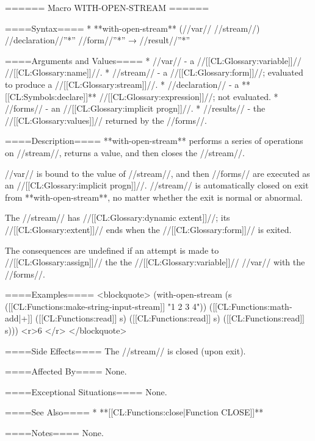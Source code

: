 ====== Macro WITH-OPEN-STREAM ======

====Syntax====
  * **with-open-stream** (//var// //stream//) //declaration//''*'' //form//''*'' → //result//''*''

====Arguments and Values====
  * //var// - a //[[CL:Glossary:variable]]// //[[CL:Glossary:name]]//.
  * //stream// - a //[[CL:Glossary:form]]//; evaluated to produce a //[[CL:Glossary:stream]]//.
  * //declaration// - a **[[CL:Symbols:declare]]** //[[CL:Glossary:expression]]//; not evaluated.
  * //forms// - an //[[CL:Glossary:implicit progn]]//.
  * //results// - the //[[CL:Glossary:values]]// returned by the //forms//.

====Description====
**with-open-stream** performs a series of operations on //stream//, returns a value, and then closes the //stream//.

//var// is bound to the value of //stream//, and then //forms// are executed as an //[[CL:Glossary:implicit progn]]//. //stream// is automatically closed on exit from **with-open-stream**, no matter whether the exit is normal or abnormal.

The //stream// has //[[CL:Glossary:dynamic extent]]//; its //[[CL:Glossary:extent]]// ends when the //[[CL:Glossary:form]]// is exited.

The consequences are undefined if an attempt is made to //[[CL:Glossary:assign]]// the the //[[CL:Glossary:variable]]// //var// with the //forms//.

====Examples====
<blockquote> 
(with-open-stream (s ([[CL:Functions:make-string-input-stream]] "1 2 3 4")) 
  ([[CL:Functions:math-add|+]] ([[CL:Functions:read]] s) 
     ([[CL:Functions:read]] s) 
     ([[CL:Functions:read]] s))) <r>6 </r>
</blockquote>

====Side Effects====
The //stream// is closed (upon exit).

====Affected By====
None.

====Exceptional Situations====
None.

====See Also====
  * **[[CL:Functions:close|Function CLOSE]]**

====Notes====
None.

  

